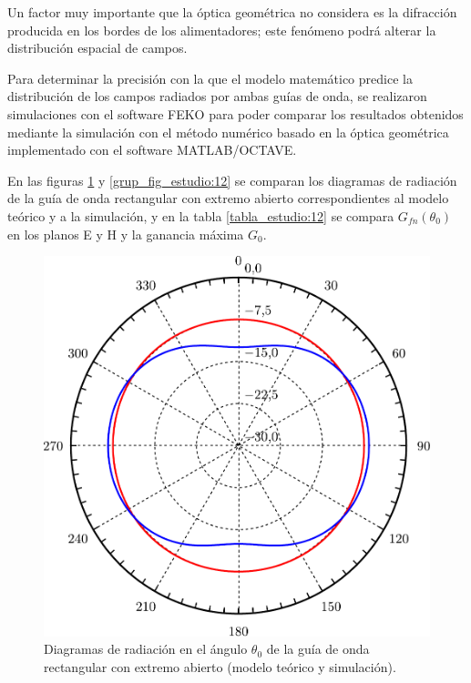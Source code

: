 Un factor muy importante que la óptica geométrica no considera es la difracción producida en los bordes de los alimentadores; este fenómeno podrá alterar la distribución espacial de campos.

Para determinar la precisión con la que el modelo matemático predice la distribución de los campos radiados por ambas guías de onda, se realizaron simulaciones con el software FEKO para poder comparar los resultados obtenidos mediante la simulación con el método numérico basado en la óptica geométrica implementado con el software MATLAB/OCTAVE.

En las figuras \ref{fig_estudio:45} y \ref{grup_fig_estudio:12} se comparan los diagramas de radiación de la guía de onda rectangular con extremo abierto correspondientes al modelo teórico y a la simulación, y en la tabla \ref{tabla_estudio:12} se compara $G_{fn}\left(\theta_0\right)$ en los planos E y H y la ganancia máxima $G_0$.
\begin{figure}[H]
\centering
\includegraphics[scale = 0.5]{Figures/Estudio/estudio_45}
\caption{Diagramas de radiación en el ángulo $\theta_0$ de la guía de onda rectangular con extremo abierto (modelo teórico y simulación).}
\label{fig_estudio:45}
\end{figure}
